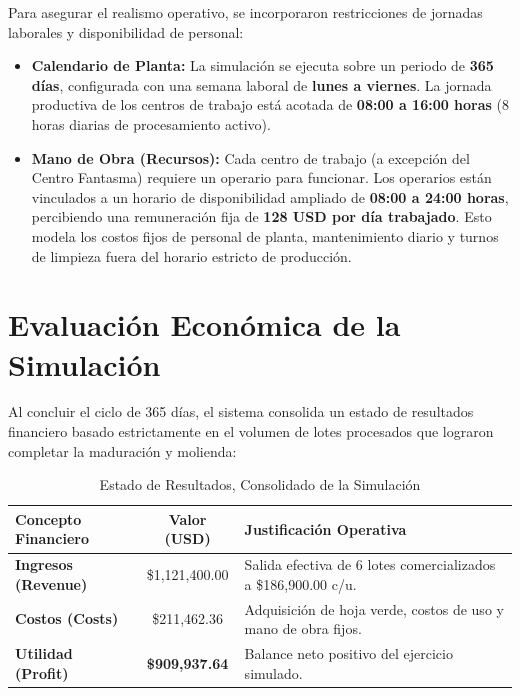 \documentclass[11pt, a4paper]{article}
\begin{document}
Para asegurar el realismo operativo, se incorporaron restricciones de jornadas laborales y disponibilidad de personal:
\begin{itemize}
    \item \textbf{Calendario de Planta:} La simulación se ejecuta sobre un periodo de \textbf{365 días}, configurada con una semana laboral de \textbf{lunes a viernes}. La jornada productiva de los centros de trabajo está acotada de \textbf{08:00 a 16:00 horas} (8 horas diarias de procesamiento activo).
    \item \textbf{Mano de Obra (Recursos):} Cada centro de trabajo (a excepción del Centro Fantasma) requiere un operario para funcionar. Los operarios están vinculados a un horario de disponibilidad ampliado de \textbf{08:00 a 24:00 horas}, percibiendo una remuneración fija de \textbf{128 USD por día trabajado}. Esto modela los costos fijos de personal de planta, mantenimiento diario y turnos de limpieza fuera del horario estricto de producción.
\end{itemize}


\section{Evaluación Económica de la Simulación}

Al concluir el ciclo de 365 días, el sistema consolida un estado de resultados financiero basado estrictamente en el volumen de lotes procesados que lograron completar la maduración y molienda:

\vspace{0.3cm}

\begin{table}[h!]
\centering
\caption{Estado de Resultados, Consolidado de la Simulación}
\vspace{0.2cm}
\small %
\begin{tabular}{l c p{6.5cm}}
\toprule
\textbf{\color{primary}Concepto Financiero} & \textbf{\color{primary}Valor (USD)} & \textbf{\color{primary}Justificación Operativa} \\
\midrule
\textbf{Ingresos (Revenue)} & \$1,121,400.00 & Salida efectiva de 6 lotes comercializados a \$186,900.00 c/u. \\
\addlinespace[0.2cm] %
\textbf{Costos (Costs)}     & \$211,462.36   & Adquisición de hoja verde, costos de uso y mano de obra fijos. \\
\midrule
\textbf{\color{accent}Utilidad (Profit)} & \textbf{\$909,937.64} & Balance neto positivo del ejercicio simulado. \\
\bottomrule
\end{tabular}
\end{table}
\end{document}
